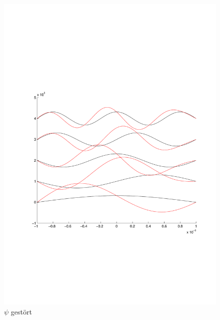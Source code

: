 \begin{refsection}
\begin{figure}
 \centering
 \includegraphics[width=12cm,clip=true,trim=2cm 7cm 1cm 8cm]{efeld/Psi_gestoert.pdf}
 \caption{$\psi$ gest\"ort}
 \label{abb:efeld_psi_gestoert}
\end{figure}


\end{refsection}
